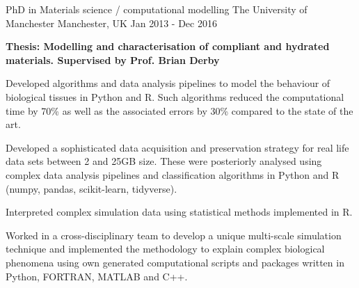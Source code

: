 


\begin{cventries}


\cventry
{PhD in Materials science / computational modelling}%
{The University of Manchester} %
{Manchester, UK} %
{Jan 2013 - Dec 2016} %
{ %
\begin{cvitems}
\item[]{\textbf{Thesis: Modelling and characterisation of compliant and hydrated materials. Supervised by Prof. Brian Derby}}
\item{ Developed algorithms and data analysis pipelines to model the behaviour of biological tissues in Python and R. Such algorithms reduced  the computational time by 70\% as well as the associated errors by 30\% compared to the state of the art.}
\item{Developed a sophisticated data acquisition and preservation strategy for real life data sets between 2 and 25GB size. These were posteriorly analysed using complex data analysis pipelines and classification algorithms in Python and R (numpy, pandas, scikit-learn, tidyverse).}
\item{Interpreted complex simulation data using statistical methods implemented in R.}
\item{ Worked in a cross-disciplinary team to develop a unique multi-scale simulation technique and implemented the methodology to explain complex biological phenomena using own generated computational scripts and packages written in Python, FORTRAN, MATLAB and C++.}

\end{cvitems}}
\end{cventries}
